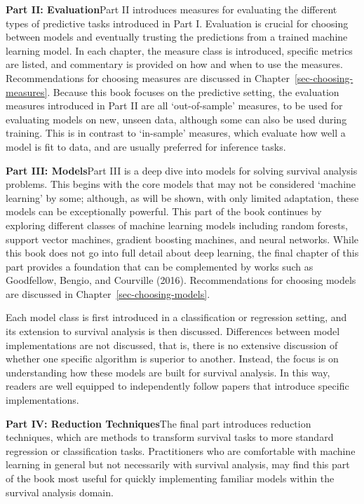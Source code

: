 \documentclass[
  letterpaper,
  krantz2]{style/krantz}
\begin{document}
\textbf{Part II: Evaluation}\newline Part II introduces measures for
evaluating the different types of predictive tasks introduced in Part I.
Evaluation is crucial for choosing between models and eventually
trusting the predictions from a trained machine learning model. In each
chapter, the measure class is introduced, specific metrics are listed,
and commentary is provided on how and when to use the measures.
Recommendations for choosing measures are discussed in
Chapter~\ref{sec-choosing-measures}. Because this book focuses on the
predictive setting, the evaluation measures introduced in Part II are
all `out-of-sample' measures, to be used for evaluating models on new,
unseen data, although some can also be used during training. This is in
contrast to `in-sample' measures, which evaluate how well a model is fit
to data, and are usually preferred for inference tasks.

\textbf{Part III: Models}\newline Part III is a deep dive into models
for solving survival analysis problems. This begins with the core models
that may not be considered `machine learning' by some; although, as will
be shown, with only limited adaptation, these models can be
exceptionally powerful. This part of the book continues by exploring
different classes of machine learning models including random forests,
support vector machines, gradient boosting machines, and neural
networks. While this book does not go into full detail about deep
learning, the final chapter of this part provides a foundation that can
be complemented by works such as Goodfellow, Bengio, and Courville
(2016). Recommendations for choosing models are discussed in
Chapter~\ref{sec-choosing-models}.

Each model class is first introduced in a classification or regression
setting, and its extension to survival analysis is then discussed.
Differences between model implementations are not discussed, that is,
there is no extensive discussion of whether one specific algorithm is
superior to another. Instead, the focus is on understanding how these
models are built for survival analysis. In this way, readers are well
equipped to independently follow papers that introduce specific
implementations.

\textbf{Part IV: Reduction Techniques}\newline The final part introduces
reduction techniques, which are methods to transform survival tasks to
more standard regression or classification tasks. Practitioners who are
comfortable with machine learning in general but not necessarily with
survival analysis, may find this part of the book most useful for
quickly implementing familiar models within the survival analysis
domain.
\end{document}
